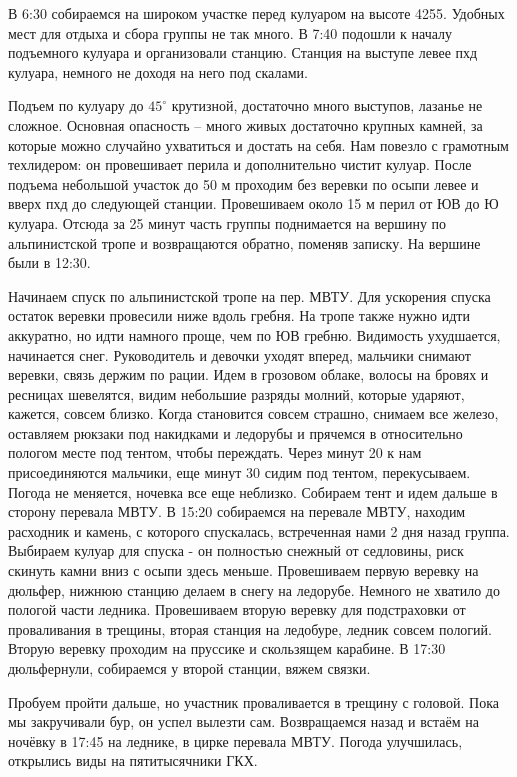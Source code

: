 В 6:30 собираемся на широком участке перед кулуаром на высоте 4255. Удобных мест для отдыха и сбора группы не так много. В 7:40 подошли к началу подъемного кулуара и организовали станцию. Станция на выступе левее пхд кулуара, немного не доходя на него под скалами.

Подъем по кулуару до $45^\circ$ крутизной, достаточно много выступов, лазанье не сложное. Основная опасность -- много живых достаточно крупных камней, за которые можно случайно ухватиться и достать на себя. Нам повезло с грамотным техлидером: он провешивает перила и дополнительно чистит кулуар. После подъема небольшой участок до 50 м проходим без веревки по осыпи левее и вверх пхд до следующей станции. Провешиваем около 15 м перил от ЮВ до Ю кулуара. Отсюда за 25 минут часть группы поднимается на вершину по альпинистской тропе и возвращаются обратно, поменяв записку. На вершине были в 12:30.

Начинаем спуск по альпинистской тропе на пер. МВТУ. Для ускорения спуска остаток веревки провесили ниже вдоль гребня. На тропе также нужно идти аккуратно, но идти намного  проще, чем по ЮВ гребню. Видимость ухудшается, начинается снег. Руководитель и девочки уходят вперед, мальчики снимают веревки, связь держим по рации. Идем в грозовом облаке, волосы на бровях и ресницах шевелятся, видим небольшие разряды молний, которые ударяют, кажется, совсем близко. Когда становится совсем страшно, снимаем все железо, оставляем рюкзаки под накидками и ледорубы и прячемся в относительно пологом месте под тентом, чтобы переждать. Через минут 20 к нам присоединяются мальчики, еще минут 30 сидим под тентом, перекусываем. Погода не меняется, ночевка все еще неблизко. Собираем тент и идем дальше в сторону перевала МВТУ. В 15:20 собираемся на перевале МВТУ, находим расходник и камень, с которого спускалась, встреченная нами 2 дня назад группа. Выбираем кулуар для спуска - он полностью снежный от седловины, риск скинуть камни вниз с осыпи здесь меньше. Провешиваем первую веревку на дюльфер, нижнюю станцию делаем в снегу на ледорубе. Немного не хватило до пологой части ледника. Провешиваем вторую веревку для подстраховки от проваливания в трещины, вторая станция на ледобуре, ледник совсем пологий. Вторую веревку проходим на пруссике и скользящем карабине. В 17:30 дюльфернули, собираемся у второй станции, вяжем связки.

Пробуем пройти дальше, но участник проваливается в трещину с головой. Пока мы закручивали бур, он успел вылезти сам. Возвращаемся назад и встаём на ночёвку в 17:45 на леднике, в цирке перевала МВТУ. Погода улучшилась, открылись виды на пятитысячники ГКХ.



